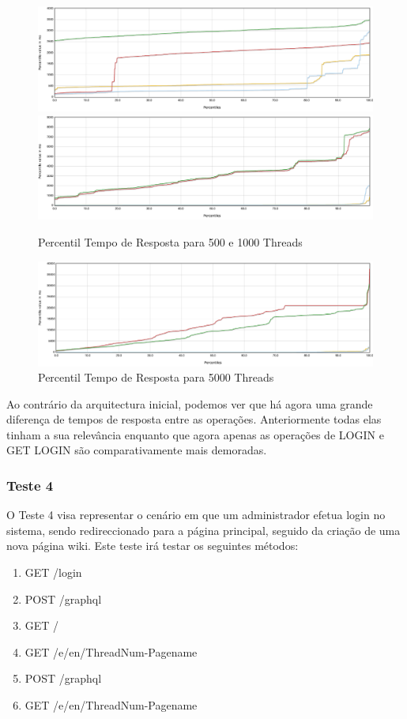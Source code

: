 \begin{figure}[ht!]
    \centering
    \includegraphics[width=.45\linewidth]{img/testes/i2-t3-500.png}
    \includegraphics[width=.45\linewidth]{img/testes/i2-t3-1000.png}
    \caption{Percentil Tempo de Resposta para 500 e 1000 Threads}
\end{figure}

\begin{figure}[ht!]
    \centering
    \includegraphics[width=.9\linewidth]{img/testes/i2-t3-5000.png}
    \caption{Percentil Tempo de Resposta para 5000 Threads}
\end{figure}

Ao contrário da arquitectura inicial, podemos ver que há agora uma grande diferença de tempos de resposta entre as operações. Anteriormente todas elas tinham a sua relevância enquanto que agora apenas as operações de LOGIN e GET LOGIN são comparativamente mais demoradas.

\subsubsection{Teste 4}


O Teste 4 visa representar o cenário em que um administrador efetua login no sistema, sendo redireccionado para a página principal, seguido da criação de uma nova página wiki. Este teste irá testar os seguintes métodos:

\begin{enumerate}
    \item GET /login
    \item POST /graphql
    \item GET /
    \item GET /e/en/ThreadNum-Pagename
    \item POST /graphql
    \item GET /e/en/ThreadNum-Pagename
\end{enumerate}

